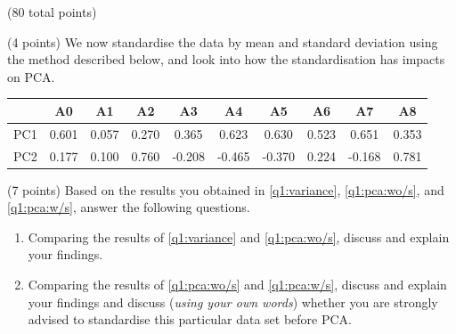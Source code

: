 \documentclass[12pt]{article}
\begin{document}
\begin{question}{(80 total points) \qOneTitle}
\begin{subquestion}{(4 points) %
    We now standardise the data by mean and standard deviation using the method described below, and look into how the standardisation has impacts on PCA.
  }
\begin{answerbox}{0.6\textheight}
\begin{enumerate}
\begin{center}
\begin{tabular}{c|c|c|c|c|c|c|c|c|c}
             &A0&A1&A2&A3&A4&A5&A6&A7&A8 \\ \hline
             PC1&0.601&0.057&0.270&0.365&0.623&0.630&0.523&0.651&0.353 \\ \hline
             PC2&0.177&0.100&0.760&-0.208&-0.465&-0.370&0.224&-0.168&0.781 \\ \hline
        \end{tabular}
    \end{center}
    \end{enumerate}
  \end{answerbox}
  


\end{subquestion}

\begin{subquestion}{(7 points)
    Based on the results you obtained in \ref{q1:variance}, \ref{q1:pca:wo/s}, and \ref{q1:pca:w/s}, answer the following questions.
  }
  \begin{enumerate}\NARROWITEM
  \item Comparing the results of \ref{q1:variance} and \ref{q1:pca:wo/s}, discuss and explain your findings.
  \item Comparing the results of \ref{q1:pca:wo/s} and \ref{q1:pca:w/s}, discuss and explain your findings and discuss ({\em using your own words}) whether you are strongly advised to standardise this particular data set before PCA.
  \end{enumerate}
   


\end{subquestion}
\end{question}
\end{document}
